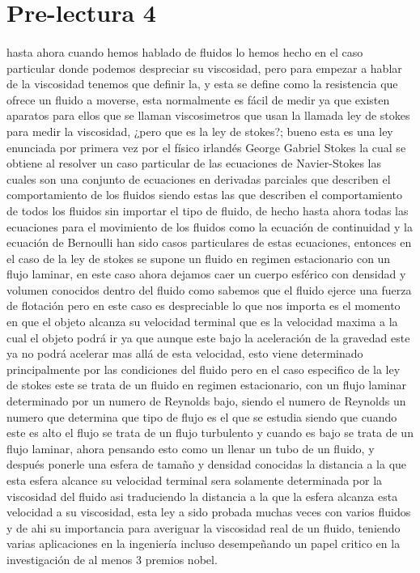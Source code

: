 \documentclass{article}
\begin{document}
\section*{Pre-lectura 4}
\paragraph*{}
hasta ahora cuando hemos hablado de fluidos lo hemos hecho en el caso particular donde podemos despreciar su viscosidad,
pero para empezar a hablar de la viscosidad tenemos que definir la, y esta se define como la resistencia que ofrece un fluido a 
moverse, esta normalmente es fácil de medir ya que existen aparatos para ellos que se llaman viscosimetros que usan la 
llamada ley de stokes para medir la viscosidad, ¿pero que es la ley de stokes?;
bueno esta es una ley enunciada por primera vez por el físico irlandés George Gabriel Stokes la cual se obtiene al resolver un caso particular
de las ecuaciones de Navier-Stokes las cuales son una conjunto de ecuaciones en derivadas parciales que describen el comportamiento de los fluidos
siendo estas las que describen el comportamiento de todos los fluidos sin importar el tipo de fluido, de hecho hasta ahora todas las ecuaciones 
para el movimiento de los fluidos como la ecuación de continuidad y la ecuación de Bernoulli han sido casos particulares de estas ecuaciones,
entonces en el caso de la ley de stokes se supone un fluido en regimen estacionario con un flujo laminar,
en este caso ahora dejamos caer un cuerpo esférico con densidad y volumen conocidos  dentro del fluido como sabemos que el fluido ejerce una fuerza de flotación 
pero en este caso es despreciable lo que nos importa es el momento en que el objeto alcanza su velocidad terminal que es la velocidad maxima a la cual 
el objeto podrá ir ya que aunque este bajo la aceleración de la gravedad este ya no podrá acelerar mas allá de esta velocidad, esto viene determinado principalmente
por las condiciones del fluido pero en el caso especifico de la ley de stokes este se trata de un fluido en regimen estacionario, con un flujo laminar
determinado por un numero de Reynolds bajo, siendo el numero de Reynolds un numero que determina que tipo de flujo es el que se estudia siendo que cuando este 
es alto el flujo se trata de un flujo turbulento y cuando es bajo se trata de un flujo laminar, ahora pensando esto como un llenar un tubo de un fluido,
y después ponerle una esfera de tamaño y densidad conocidas la distancia a la que esta esfera alcance su velocidad terminal sera solamente
determinada por la viscosidad del fluido asi traduciendo la distancia a la que la esfera alcanza esta velocidad a su viscosidad,
esta ley a sido probada muchas veces con varios fluidos y de ahi su importancia para averiguar la viscosidad real de un fluido, teniendo
varias aplicaciones en la ingeniería incluso desempeñando un papel critico en la investigación de al menos 3 premios nobel.
\end{document}
